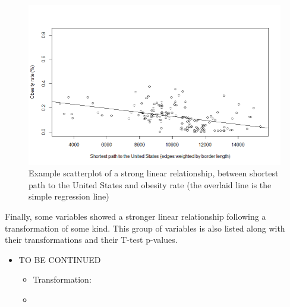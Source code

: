 \documentclass[oneside,12pt]{report}
\begin{document}
\begin{figure}
\centering
\caption{Example scatterplot of a strong linear relationship, between shortest path to the United States and obesity rate (the overlaid line is the simple regression line)}
\label{fig:shortpath-obesity-scatter}
\includegraphics[width=\textwidth]{borderdegrees_wtd-obrate-scatter.png}
\end{figure}

Finally, some variables showed a stronger linear relationship following a transformation of some kind. This group of variables is also listed along with their transformations and their T-test p-values.

\begin{itemize}
\item TO BE CONTINUED
	\begin{itemize}
	\item Transformation:
	\item
	\end{itemize}
\end{itemize}
\end{document}
